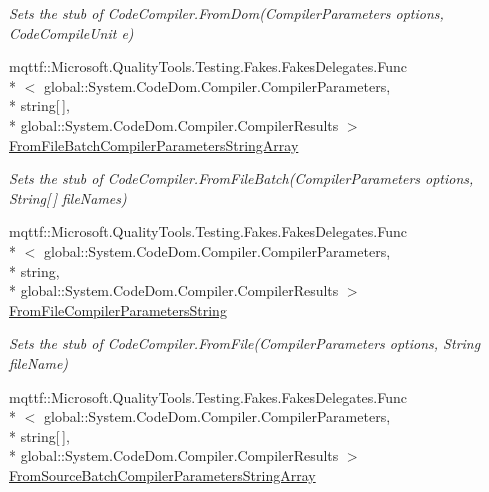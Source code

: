 \begin{DoxyCompactItemize}
\begin{DoxyCompactList}\small\item\em Sets the stub of Code\-Compiler.\-From\-Dom(\-Compiler\-Parameters options, Code\-Compile\-Unit e)\end{DoxyCompactList}\item 
mqttf\-::\-Microsoft.\-Quality\-Tools.\-Testing.\-Fakes.\-Fakes\-Delegates.\-Func\\*
$<$ global\-::\-System.\-Code\-Dom.\-Compiler.\-Compiler\-Parameters, \\*
string\mbox{[}$\,$\mbox{]}, \\*
global\-::\-System.\-Code\-Dom.\-Compiler.\-Compiler\-Results $>$ \hyperlink{class_system_1_1_code_dom_1_1_compiler_1_1_fakes_1_1_stub_code_compiler_a4670a43c3d5108460fc358f498dafbd4}{From\-File\-Batch\-Compiler\-Parameters\-String\-Array}
\begin{DoxyCompactList}\small\item\em Sets the stub of Code\-Compiler.\-From\-File\-Batch(\-Compiler\-Parameters options, String\mbox{[}$\,$\mbox{]} file\-Names)\end{DoxyCompactList}\item 
mqttf\-::\-Microsoft.\-Quality\-Tools.\-Testing.\-Fakes.\-Fakes\-Delegates.\-Func\\*
$<$ global\-::\-System.\-Code\-Dom.\-Compiler.\-Compiler\-Parameters, \\*
string, \\*
global\-::\-System.\-Code\-Dom.\-Compiler.\-Compiler\-Results $>$ \hyperlink{class_system_1_1_code_dom_1_1_compiler_1_1_fakes_1_1_stub_code_compiler_a2aa85db45f5b6ff1a81dcbb2aaf18166}{From\-File\-Compiler\-Parameters\-String}
\begin{DoxyCompactList}\small\item\em Sets the stub of Code\-Compiler.\-From\-File(\-Compiler\-Parameters options, String file\-Name)\end{DoxyCompactList}\item 
mqttf\-::\-Microsoft.\-Quality\-Tools.\-Testing.\-Fakes.\-Fakes\-Delegates.\-Func\\*
$<$ global\-::\-System.\-Code\-Dom.\-Compiler.\-Compiler\-Parameters, \\*
string\mbox{[}$\,$\mbox{]}, \\*
global\-::\-System.\-Code\-Dom.\-Compiler.\-Compiler\-Results $>$ \hyperlink{class_system_1_1_code_dom_1_1_compiler_1_1_fakes_1_1_stub_code_compiler_a473d99cb2460d11bf86220e40dddca7c}{From\-Source\-Batch\-Compiler\-Parameters\-String\-Array}

\end{DoxyCompactItemize}
